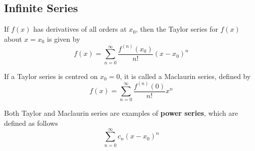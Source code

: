 \documentclass{article}
\begin{document}
\subsection{Infinite Series}
\begin{definition}
    If $f(x)$  has derivatives of all orders at $x_0$, then the Taylor series
    for $f(x)$ about $x=x_0$ is given by
    \begin{equation*}
        f(x) = \sum_{n=0}^{\infty} \frac{f^{\left( n \right)}(x_0)}{n!}\left( x-x_0 \right)^n
    \end{equation*}
\end{definition}
\begin{definition}
    If a Taylor series is centred on $x_0=0$, it is called a Maclaurin series,
    defined by
    \begin{equation*}
        f(x) = \sum_{n=0}^{\infty} \frac{f^{\left( n \right)}(0)}{n!} x^n
    \end{equation*}
\end{definition}
\begin{definition}
    Both Taylor and Maclaurin series are examples of \textbf{power series},
    which are defined as follows
    \begin{equation*}
        \sum_{n=0}^{\infty} c_n\left( x-x_0 \right)^n
    \end{equation*}
\end{definition}
\end{document}
